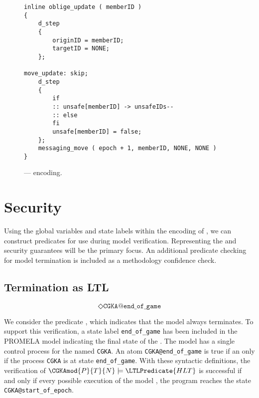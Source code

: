 \begin{figure}[h!]
  \centering
  \caption{\label{fig:Oracle-Update}\CGKAmod{}{}{} ---  encoding.}
\begin{verbatim}
inline oblige_update ( memberID )
{
    d_step
    {
        originID = memberID;
        targetID = NONE;
    };

move_update: skip;
    d_step
    {
        if
        :: unsafe[memberID] -> unsafeIDs--
        :: else
        fi
        unsafe[memberID] = false;
    };
    messaging_move ( epoch + 1, memberID, NONE, NONE )
}
\end{verbatim}
\end{figure}


\hypertarget{sec:LTL-security}{%
\section{Security}\label{sec:LTL-security}}

Using the global variables and state labels within the encoding of , we can construct  predicates for use during model verification.
Representing the  and  security guarantees will be the primary focus.
An additional predicate checking for model termination is included as a methodology confidence check.


\hypertarget{sec:hlt-as-ltl}{%
\subsection{Termination as LTL}\label{sec:hlt-as-ltl}}

\begin{LTL}
    $$
    \Diamond \texttt{CGKA@end\_of\_game}
    $$
\end{LTL}

We consider the  predicate , which indicates that the  model always terminates.
To support this verification, a state label \texttt{end\_of\_game} has been included in the PROMELA model indicating the final state of the \CGKAsec. 
The model has a single control process for the \CGKAsec named \texttt{CGKA}.
An  atom \texttt{CGKA@end\_of\_game} is true if an only if the process \texttt{CGKA} is at state \texttt{end\_of\_game}.
With these syntactic definitions, the verification of \(\CGKAmod{P}{T}{N} \models \LTLPredicate{HLT} \) is successful if and only if every possible execution of the model \CGKAmod{}{}{}, the program reaches the state \texttt{CGKA@start\_of\_epoch}.


